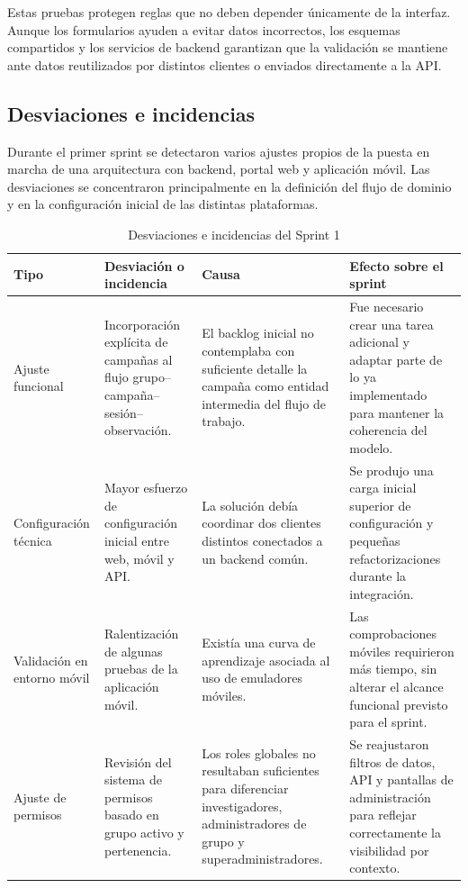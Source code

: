 Estas pruebas protegen reglas que no deben depender únicamente de la interfaz. Aunque los formularios ayuden a evitar datos incorrectos, los esquemas compartidos y los servicios de backend garantizan que la validación se mantiene ante datos reutilizados por distintos clientes o enviados directamente a la API.

\subsection{Desviaciones e incidencias}

Durante el primer sprint se detectaron varios ajustes propios de la puesta en
marcha de una arquitectura con backend, portal web y aplicación móvil. Las
desviaciones se concentraron principalmente en la definición del flujo de
dominio y en la configuración inicial de las distintas plataformas.

\begin{table}[H]
\centering
\caption{Desviaciones e incidencias del Sprint 1}
\label{tab:desviaciones_sprint1}
\small
\setlength{\tabcolsep}{4pt}
\renewcommand{\arraystretch}{1.22}
\begin{tabularx}{\textwidth}{|>{\raggedright\arraybackslash}p{2.6cm}|>{\raggedright\arraybackslash}X|>{\raggedright\arraybackslash}X|>{\raggedright\arraybackslash}X|}
\hline
\textbf{Tipo} & \textbf{Desviación o incidencia} & \textbf{Causa} & \textbf{Efecto sobre el sprint} \\
\hline
Ajuste funcional & Incorporación explícita de campañas al flujo grupo--campaña--sesión--observación. & El backlog inicial no contemplaba con suficiente detalle la campaña como entidad intermedia del flujo de trabajo. & Fue necesario crear una tarea adicional y adaptar parte de lo ya implementado para mantener la coherencia del modelo. \\
\hline
Configuración técnica & Mayor esfuerzo de configuración inicial entre web, móvil y API. & La solución debía coordinar dos clientes distintos conectados a un backend común. & Se produjo una carga inicial superior de configuración y pequeñas refactorizaciones durante la integración. \\
\hline
Validación en entorno móvil & Ralentización de algunas pruebas de la aplicación móvil. & Existía una curva de aprendizaje asociada al uso de emuladores móviles. & Las comprobaciones móviles requirieron más tiempo, sin alterar el alcance funcional previsto para el sprint. \\
\hline
Ajuste de permisos & Revisión del sistema de permisos basado en grupo activo y pertenencia. & Los roles globales no resultaban suficientes para diferenciar investigadores, administradores de grupo y superadministradores. & Se reajustaron filtros de datos, API y pantallas de administración para reflejar correctamente la visibilidad por contexto. \\
\hline
\end{tabularx}
\end{table}

